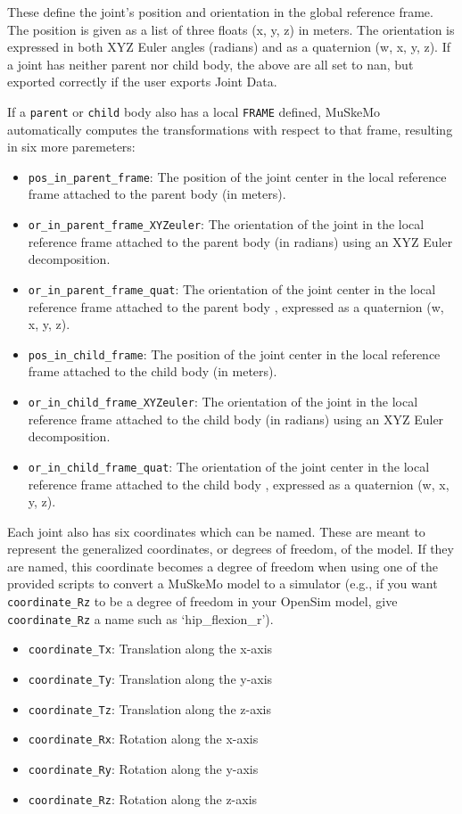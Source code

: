\documentclass{article}
\begin{document}
These define the joint's position and orientation in the global reference frame. The position is given as a list of three floats (x, y, z) in meters. The orientation is expressed in both XYZ Euler angles (radians) and as a quaternion (w, x, y, z). If a joint has neither parent nor child body, the above are all set to nan, but exported correctly if the user exports Joint Data.

If a \texttt{parent} or \texttt{child} body also has a local \texttt{FRAME} defined, MuSkeMo automatically computes the transformations with respect to that frame, resulting in six more paremeters:

\begin{itemize}
    \item \texttt{pos\_in\_parent\_frame}: The position of the joint center in the local reference frame attached to the parent body (in meters).
    \item \texttt{or\_in\_parent\_frame\_XYZeuler}: The orientation of the joint in the local reference frame attached to the parent body (in radians) using an XYZ Euler decomposition.
    \item \texttt{or\_in\_parent\_frame\_quat}: The orientation of the joint center in the local reference frame attached to the parent body , expressed as a quaternion (w, x, y, z).
    \item \texttt{pos\_in\_child\_frame}: The position of the joint center in the local reference frame attached to the child body (in meters).
    \item \texttt{or\_in\_child\_frame\_XYZeuler}: The orientation of the joint in the local reference frame attached to the child body (in radians) using an XYZ Euler decomposition.
    \item \texttt{or\_in\_child\_frame\_quat}: The orientation of the joint center in the local reference frame attached to the child body , expressed as a quaternion (w, x, y, z).
\end{itemize}

Each joint also has six coordinates which can be named. These are meant to represent the generalized coordinates, or degrees of freedom, of the model. If they are named, this coordinate becomes a degree of freedom when using one of the provided scripts to convert a MuSkeMo model to a simulator (e.g., if you want \texttt{coordinate\_Rz} to be a degree of freedom in your OpenSim model, give \texttt{coordinate\_Rz} a name such as ‘hip\_flexion\_r’).

\begin{itemize}
    \item \texttt{coordinate\_Tx}: Translation along the x-axis
    \item \texttt{coordinate\_Ty}: Translation along the y-axis
    \item \texttt{coordinate\_Tz}: Translation along the z-axis
    \item \texttt{coordinate\_Rx}: Rotation along the x-axis
    \item \texttt{coordinate\_Ry}: Rotation along the y-axis
    \item \texttt{coordinate\_Rz}: Rotation along the  z-axis
\end{itemize}
\end{document}
